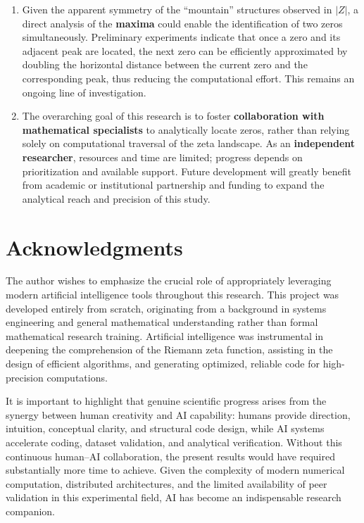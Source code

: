 \documentclass[11pt,a4paper]{article}
\begin{document}
\begin{enumerate}
    \item Given the apparent symmetry of the ``mountain'' structures observed in \(|Z|\), a direct analysis of the \textbf{maxima} could enable the identification of two zeros simultaneously.  
    Preliminary experiments indicate that once a zero and its adjacent peak are located, the next zero can be efficiently approximated by doubling the horizontal distance between the current zero and the corresponding peak, thus reducing the computational effort.  
    This remains an ongoing line of investigation.
    
    \item The overarching goal of this research is to foster \textbf{collaboration with mathematical specialists} to analytically locate zeros, rather than relying solely on computational traversal of the zeta landscape.  
    As an \textbf{independent researcher}, resources and time are limited; progress depends on prioritization and available support.  
    Future development will greatly benefit from academic or institutional partnership and funding to expand the analytical reach and precision of this study.
\end{enumerate}

\section*{Acknowledgments}

The author wishes to emphasize the crucial role of appropriately leveraging modern artificial intelligence tools throughout this research.  
This project was developed entirely from scratch, originating from a background in systems engineering and general mathematical understanding rather than formal mathematical research training.  
Artificial intelligence was instrumental in deepening the comprehension of the Riemann zeta function, assisting in the design of efficient algorithms, and generating optimized, reliable code for high-precision computations.

It is important to highlight that genuine scientific progress arises from the synergy between human creativity and AI capability:  
humans provide direction, intuition, conceptual clarity, and structural code design, while AI systems accelerate coding, dataset validation, and analytical verification.  
Without this continuous human–AI collaboration, the present results would have required substantially more time to achieve.  
Given the complexity of modern numerical computation, distributed architectures, and the limited availability of peer validation in this experimental field, AI has become an indispensable research companion.
\end{document}
